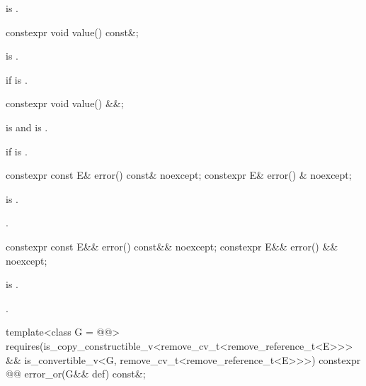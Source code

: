 \begin{itemdescr}
\pnum
\hardexpects
{} is .
\end{itemdescr}

%
\begin{itemdecl}
constexpr void value() const&;
\end{itemdecl}

\begin{itemdescr}
\pnum
\mandates
{} is .

\pnum
\throws
{} if  is .
\end{itemdescr}

%
\begin{itemdecl}
constexpr void value() &&;
\end{itemdecl}

\begin{itemdescr}
\pnum
\mandates
{} is  and  is .

\pnum
\throws
{} if  is .
\end{itemdescr}

%
\begin{itemdecl}
constexpr const E& error() const& noexcept;
constexpr E& error() & noexcept;
\end{itemdecl}

\begin{itemdescr}
\pnum
\hardexpects
{} is .

\pnum
\returns
{}.
\end{itemdescr}

%
\begin{itemdecl}
constexpr const E&& error() const&& noexcept;
constexpr E&& error() && noexcept;
\end{itemdecl}

\begin{itemdescr}
\pnum
\hardexpects
{} is .

\pnum
\returns
{}.
\end{itemdescr}

%
\begin{itemdecl}
template<class G = @@>
  requires(is_copy_constructible_v<remove_cv_t<remove_reference_t<E>>> &&
           is_convertible_v<G, remove_cv_t<remove_reference_t<E>>>)
constexpr @@ error_or(G&& def) const&;
\end{itemdecl}

